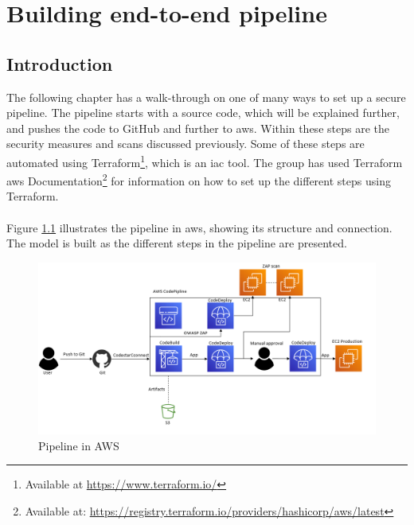 \newpage
\thispagestyle{empty}
\mbox{}

\chapter{Building end-to-end pipeline}
\label{Deployment}
\section{Introduction}
The following chapter has a walk-through on one of many ways to set up a secure pipeline. The pipeline starts with a source code, which will be explained further, and pushes the code to GitHub and further to \acrshort{aws}. Within these steps are the security measures and scans discussed previously. Some of these steps are automated using Terraform\footnote{Available at \url{https://www.terraform.io/}}, which is an \gls{iac} tool. The group has used Terraform \acrshort{aws} Documentation\footnote{Available at: \url{https://registry.terraform.io/providers/hashicorp/aws/latest}} for information on how to set up the different steps using Terraform. 
\\~\\
Figure \ref{fig: Pipeline in AWS} illustrates the pipeline in \acrshort{aws}, showing its structure and connection. The model is built as the different steps in the pipeline are presented.

\vspace{2mm}
\begin{figure}[H]
    \centering
    \includegraphics[width=1\columnwidth]{Images/aws-piplin-7.png}
    \caption{Pipeline in AWS}
    \label{fig: Pipeline in AWS}
\end{figure}

